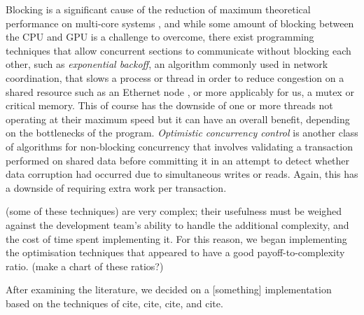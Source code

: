 \documentclass[11pt, a4paper, twocolumn]{article}
\begin{document}
Blocking is a significant cause of the reduction of maximum theoretical performance on multi-core systems \citep{Alemany1992}, and while some amount of blocking between the CPU and GPU is a challenge to overcome, there exist programming techniques that allow concurrent sections to communicate without blocking each other, such as \emph{exponential backoff}, an algorithm commonly used in network coordination, that slows a process or thread in order to reduce congestion on a shared resource such as an Ethernet node \citep{Goodman2019}, or more applicably for us, a mutex or critical memory. This of course has the downside of one or more threads not operating at their maximum speed but it can have an overall benefit, depending on the bottlenecks of the program. \emph{Optimistic concurrency control} is another class of algorithms for non-blocking concurrency that involves validating a transaction performed on shared data before committing it \cite{Herlihy1993} in an attempt to detect whether data corruption had occurred due to simultaneous writes or reads. Again, this has a downside of requiring extra work per transaction.


(some of these techniques) are very complex; their usefulness must be weighed against the development team's ability to handle the additional complexity, and the cost of time spent implementing it. For this reason, we began implementing the optimisation techniques that appeared to have a good payoff-to-complexity ratio. (make a chart of these ratios?)



After examining the literature, we decided on a [something] implementation based on the techniques of cite, cite, cite, and cite.






\end{document}
